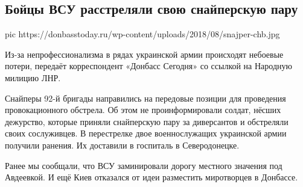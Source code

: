  
 
 
 
 
 
\subsection{Бойцы ВСУ расстреляли свою снайперскую пару}
\label{sec:13_12_2020.news.dnr.donbass_today.1.vsu_snajpery}

\ifcmt
pic https://donbasstoday.ru/wp-content/uploads/2018/08/snajper-chb.jpg
\fi

Из-за непрофессионализма в рядах украинской армии происходят небоевые потери,
передаёт корреспондент «Донбасс Сегодня» со ссылкой на Народную милицию ЛНР.

Снайперы 92-й бригады направились на передовые позиции для проведения
провокационного обстрела. Об этом не проинформировали солдат, нёсших дежурство,
которые приняли снайперскую пару за диверсантов и обстреляли своих сослуживцев.
В перестрелке двое военнослужащих украинской армии получили ранения. Их
доставили в госпиталь в Северодонецке.

Ранее мы сообщали, что ВСУ заминировали дорогу местного значения под Авдеевкой.
И ещё Киев отказался от идеи разместить миротворцев в Донбассе.
